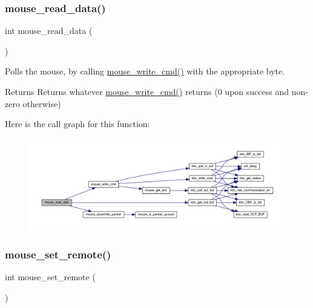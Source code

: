\subsubsection{\texorpdfstring{mouse\+\_\+read\+\_\+data()}{mouse\_read\_data()}}
{\footnotesize\ttfamily int mouse\+\_\+read\+\_\+data (\begin{DoxyParamCaption}{ }\end{DoxyParamCaption})}



Polls the mouse, by calling \mbox{\hyperlink{group__mouse_ga14261d6dca45cb7cc9c8a786739ac5a3}{mouse\+\_\+write\+\_\+cmd()}} with the appropriate byte. 

\begin{DoxyReturn}{Returns}
Returns whatever \mbox{\hyperlink{group__mouse_ga14261d6dca45cb7cc9c8a786739ac5a3}{mouse\+\_\+write\+\_\+cmd()}} returns (0 upon success and non-\/zero otherwise) 
\end{DoxyReturn}
Here is the call graph for this function\+:\nopagebreak
\begin{figure}[H]
\begin{center}
\leavevmode
\includegraphics[width=350pt]{group__mouse_ga0eb4568033242c6785c4e2c48a77c927_cgraph}
\end{center}
\end{figure}
\mbox{\label{group__mouse_ga848ca3a5a4826200866774d23c80d286}} 
\subsubsection{\texorpdfstring{mouse\+\_\+set\+\_\+remote()}{mouse\_set\_remote()}}
{\footnotesize\ttfamily int mouse\+\_\+set\+\_\+remote (\begin{DoxyParamCaption}{ }\end{DoxyParamCaption})}



